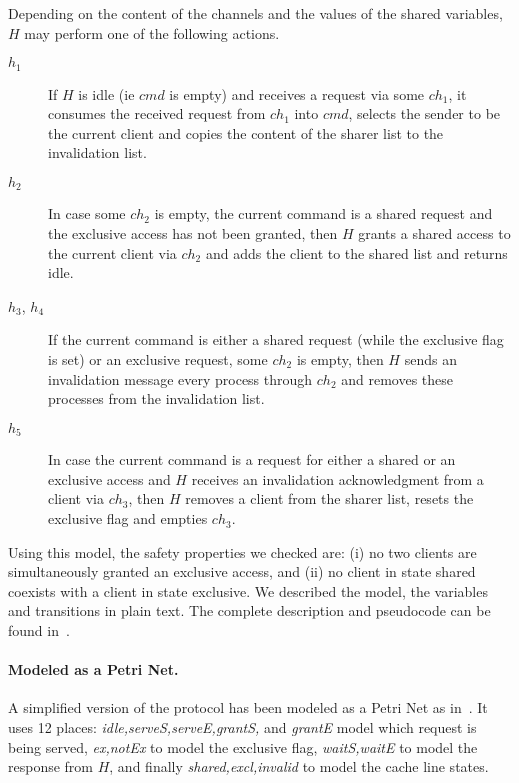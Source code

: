 Depending on the content of the channels and the values of the shared
variables, $H$ may perform one of the following actions.
\begin{description}
\item[\color{orange} $h_1$] If $H$ is idle (ie $cmd$ is empty) and receives a request via
  some $ch_1$, it consumes the received request from $ch_1$ into
  $cmd$, selects the sender to be the current client and copies the
  content of the sharer list to the invalidation list.
\item[\color{orange} $h_2$] In case some $ch_2$ is empty, the current command is a
  shared request and the exclusive access has not been granted, then
  $H$ grants a shared access to the current client via $ch_2$ and adds
  the client to the shared list and returns idle.
\item[{\color{orange} $h_3$},{\color{orange} $h_4$}] If the current command is either a shared request
  (while the exclusive flag is set) or an exclusive request, some
  $ch_2$ is empty, then $H$ sends an invalidation message every
  process through $ch_2$ and removes these processes from the
  invalidation list.
\item[\color{orange} $h_5$] In case the current command is a request for either a
  shared or an exclusive access and $H$ receives an invalidation
  acknowledgment from a client via $ch_3$, then $H$ removes a client
  from the sharer list, resets the exclusive flag and empties $ch_3$.
\end{description}
%
Using this model, the safety properties we checked are: (i) no two
clients are simultaneously granted an exclusive access, and (ii) no
client in state shared coexists with a client in state exclusive.
%
We described the model, the variables and transitions in plain
text. The complete description and pseudocode can be found
in~\cite{PRZ-tacas01}. 

\paragraph{Modeled as a Petri Net.}
A simplified version of the protocol has been modeled as a Petri Net
as in~\cite{Raskin:experiments:German}. It uses 12 places:
\emph{idle,serveS,serveE,grantS,} and \emph{grantE} model which
request is being served, \emph{ex,notEx} to model the exclusive flag,
\emph{waitS,waitE} to model the response from $H$, and finally
\emph{shared,excl,invalid} to model the cache line states.

